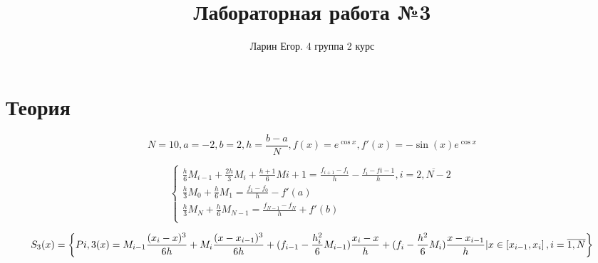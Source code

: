 \documentclass{article}
\title{Лабораторная работа №3}
\author{Ларин Егор. 4 группа 2 курс}
\begin{document}
\maketitle
\section*{Теория}

\begin{equation*}
    N= 10, a = -2, b=2, h = \frac{b-a}{N}, f(x) = e ^ {\cos x}, f'(x) = -\sin(x) e^{\cos x}
\end{equation*}



\begin{equation*}
    \begin{cases}
        \frac{h}{6} M_{i-1} + \frac{2h}{3} M_i + \frac{h+1}{6} M{i+1} = \frac{f_{i+1} - f_i}{h} - \frac{f_i - f{i-1}}{h}, i = \overline{2, N-2}\\
        \frac{h}{3}M_0 + \frac{h}{6} M_1 = \frac{f_1 - f_0}{h} - f'(a)\\
        \frac{h}{3}M_N + \frac{h}{6} M_{N-1} = \frac{f_{N-1} - f_N}{h} + f'(b)\\
    \end{cases}
\end{equation*}

\begin{equation*}
    S_3(x) = \left\{ P{i,3}(x) = M_{i-1} \frac{(x_i - x)^3}{6h} + M_i \frac{(x-x_{i-1})^3}{6h} + (f_{i-1} - \frac{h_i^2}{6} M_{i-1} )\frac{x_i -x}{h} + (f_i - \frac{h^2}{6} M_i)\frac{x-x_{i-1}}{h} \\| x \in \left[ x_{i-1}, x_i \right], i = \overline{1, N} \right\}
\end{equation*}
\end{document}
